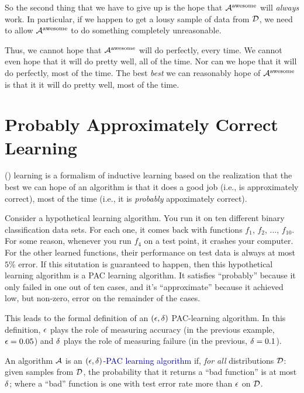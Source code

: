 So the second thing that we have to give up is the hope that
$\mathcal{A}^{\text{awesome}}$ will \emph{always} work.  In particular, if we
happen to get a lousy sample of data from $\mathcal{D}$, we need to allow
$\mathcal{A}^{\text{awesome}}$ to do something completely unreasonable.

Thus, we cannot hope that $\mathcal{A}^{\text{awesome}}$ will do perfectly,
every time.  We cannot even hope that it will do pretty well, all of
the time.  Nor can we hope that it will do perfectly, most of the
time.  The best \emph{best} we can reasonably hope of
$\mathcal{A}^{\text{awesome}}$ is that it it will do pretty well, most of the
time.

\section{Probably Approximately Correct Learning}

 () learning is a
formalism of inductive learning based on the realization that the best
we can hope of an algorithm is that it does a good job (i.e., is
approximately correct), most of the time (i.e., it is \emph{probably}
appoximately correct).

Consider a hypothetical learning algorithm.  You run it on ten
different binary classification data sets.  For each one, it comes
back with functions $f_1$, $f_2$, $\dots$, $f_{10}$.  For some reason,
whenever you run $f_4$ on a test point, it crashes your computer.  For
the other learned functions, their performance on test data is always
at most $5\%$ error.  If this situtation is guaranteed to happen, then
this hypothetical learning algorithm is a PAC learning algorithm.  It
satisfies ``probably'' because it only failed in one out of ten cases,
and it's ``approximate'' because it achieved low, but non-zero, error
on the remainder of the cases.

This leads to the formal definition of an $(\epsilon,\delta)$ PAC-learning
algorithm.  In this definition, $\epsilon$ plays the role of measuring
accuracy (in the previous example, $\epsilon = 0.05$) and $\delta$ plays the
role of measuring failure (in the previous, $\delta = 0.1$).  

\begin{definition}
  An algorithm $\mathcal{A}$ is an \textcolor{darkblue}{$(\epsilon,\delta)$-PAC
    learning algorithm} if, \emph{for all} distributions $\mathcal{D}$: given
  samples from $\mathcal{D}$, the probability that it returns a ``bad
  function'' is at most $\delta$; where a ``bad'' function is one with
  test error rate more than $\epsilon$ on $\mathcal{D}$.
\end{definition}

